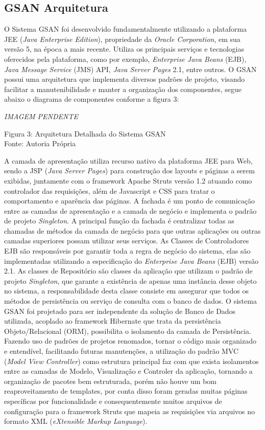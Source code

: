 \subsection{GSAN Arquitetura}
	
O Sistema GSAN foi desenvolvido fundamentalmente utilizando a plataforma JEE (\textit{Java Enterprise Edition}), propriedade da \textit{Oracle Corporation}, em sua versão 5, na época a mais recente. Utiliza os principais serviços e tecnologias oferecidos pela plataforma, como por exemplo, \textit{Enterprise Java Beans} (EJB), \textit{Java Message Service} (JMS) API, \textit{Java Server Pages} 2.1, entre outros.
O GSAN possui uma arquitetura que implementa diversos padrões de projeto, visando facilitar a manutenibilidade e manter a organização dos componentes, segue abaixo o diagrama de componentes conforme a figura 3:

\textit{IMAGEM PENDENTE} \\
\begin{center}
	Figura 3: Arquitetura Detalhada do Sistema GSAN \\
	Fonte: Autoria Própria	
\end{center}

	
A camada de apresentação utiliza recurso nativo da plataforma JEE para Web, sendo a JSP (\textit{Java Server Pages}) para construção dos layouts e páginas a serem exibidas, juntamente com o framework Apache Struts versão 1.2 atuando como controlador das requisições, além de Javascript e CSS para tratar o comportamento e aparência das páginas.
A fachada é um ponto de comunicação entre as camadas de apresentação e a camada de negócio e implementa o padrão de projeto \textit{Singleton}. A principal função da fachada é centralizar todas as chamadas de métodos da camada de negócio para que outras aplicações ou outras camadas superiores possam utilizar seus serviços.
As Classes de Controladores EJB são responsáveis por garantir toda a regra de negócio do sistema, elas são implementadas utilizando a especificação do \textit{Enterprise Java Beans} (EJB) versão 2.1.
As classes de Repositório são classes da aplicação que utilizam o padrão de projeto \textit{Singleton}, que garante a existência de apenas uma instância desse objeto no sistema, a responsabilidade desta classe consiste em assegurar que todos os métodos de persistência ou serviço de consulta com o banco de dados.
O sistema GSAN foi projetado para ser independente da solução de Banco de Dados utilizada, acoplado ao framework Hibernate que trata da persistência Objeto/Relacional (ORM), possibilita o isolamento da camada de Persistência. Fazendo uso de padrões de projetos renomados, tornar o código mais organizado e entendível, facilitando futuras manutenções, a utilização do padrão MVC (\textit{Model View Controller}) como estrutura principal faz com que exista isolamentos entre as camadas de Modelo, Visualização e Controler da aplicação, tornando a organização de pacotes bem estruturada, porém  não houve um bom reaproveitamento de templates, por conta disso foram geradas muitas páginas específicas por funcionalidade e consequentemente muitos arquivos de configuração para o framework Struts  que mapeia as requisições via arquivos no formato XML (\textit{eXtensible Markup Language}).
	
